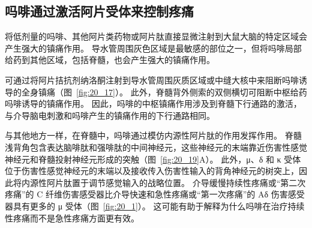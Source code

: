 \subsection{吗啡通过激活阿片受体来控制疼痛}

将低剂量的吗啡、其他阿片类药物或阿片肽直接显微注射到大鼠大脑的特定区域会产生强大的镇痛作用。
导水管周围灰色区域是最敏感的部位之一，但将吗啡局部给药到其他区域，包括脊髓，也会产生强大的镇痛作用。


可通过将阿片拮抗剂纳洛酮注射到导水管周围灰质区域或中缝大核中来阻断吗啡诱导的全身镇痛（图~\ref{fig:20_17}）。
此外，脊髓背外侧索的双侧横切可阻断中枢给药吗啡诱导的镇痛作用。
因此，吗啡的中枢镇痛作用涉及到脊髓下行通路的激活，与介导脑电刺激和吗啡产生的镇痛作用的下行通路相同。


与其他地方一样，在脊髓中，吗啡通过模仿内源性阿片肽的作用发挥作用。
脊髓浅背角包含表达脑啡肽和强啡肽的中间神经元，这些神经元的末端靠近伤害性感觉神经元和脊髓投射神经元形成的突触（图~\ref{fig:20_19}A）。
此外，μ、δ 和 κ 受体位于伤害性感觉神经元的末端以及接收传入伤害性输入的背角神经元的树突上，因此将内源性阿片肽置于调节感觉输入的战略位置。
介导缓慢持续性疼痛或“第二次疼痛”的 C 纤维伤害感受器比介导快速和急性疼痛或“第一次疼痛”的 Aδ 伤害感受器具有更多的 μ 受体（图~\ref{fig:20_1}）。
这可能有助于解释为什么吗啡在治疗持续性疼痛而不是急性疼痛方面更有效。


